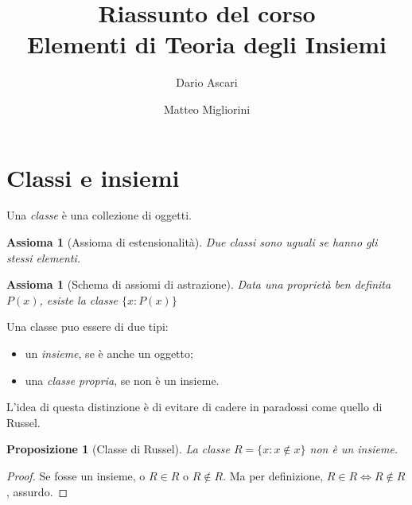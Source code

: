 \documentclass[a4paper,10pt,oneside]{article}
\title{Riassunto del corso \\ Elementi di Teoria degli Insiemi}
\author{Dario Ascari \and Matteo Migliorini}
\date{}
\newcommand{\myname}[1]{\emph{#1}}
\newcommand{\nin}{\not\in}
\theoremstyle{plain}
\newtheorem{myprop}[mytheorem]{Proposizione}
\newtheorem{myax}[mytheorem]{Assioma}
\theoremstyle{definition}
\theoremstyle{remark}
\begin{document}
\maketitle

\cleardoublepage


\cleardoublepage

\tableofcontents
\cleardoublepage




\section{Classi e insiemi}

Una \myname{classe} è una collezione di oggetti. 

\begin{myax}[Assioma di estensionalità]
 Due classi sono uguali se hanno gli stessi elementi.
\end{myax}
\begin{myax}[Schema di assiomi di astrazione]
 Data una proprietà ben definita $P(x)$, esiste la classe $\{x: P(x)\}$
\end{myax}

Una classe puo essere di due tipi:

\begin{itemize}
 \item un \myname{insieme}, se è anche un oggetto;
 \item una \myname{classe propria}, se non è un insieme.
\end{itemize}

L'idea di questa distinzione è di evitare di cadere in paradossi come quello di Russel.
\begin{myprop}[Classe di Russel]
  La classe $R=\{x:x\not \in x\}$ non è un insieme.
\end{myprop}
\begin{proof}
 Se fosse un insieme, o $R\in R$ o $R \nin R$. Ma per definizione, $R\in R \Leftrightarrow R \nin R$, assurdo.
\end{proof}
\end{document}
